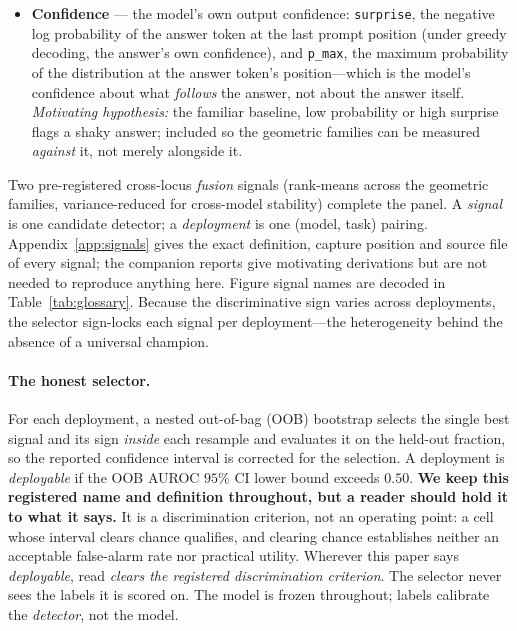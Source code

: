 \documentclass[11pt]{article}
\begin{document}
\begin{itemize}
spectral entropy, and a rank-1 ``pseudo-volume'' of the centered softmax-Fisher spectrum). Each is
\emph{averaged over the readout and the logit-lens distributions of the last quarter of blocks}, at
the answer token's position---not read from the readout alone, as the name might suggest
(Appendix~\ref{app:signals}). The one exception is the non-byte-comparable extension cells of
Section~\ref{sec:scale}, whose reimplemented extractors compute RPV on the readout alone.
\emph{Motivating hypothesis:} a well-supported readout concentrates on
a few output directions, while an unsupported one spreads probability over many, inflating its
effective volume.
\item \textbf{Confidence} --- the model's own output confidence: \texttt{surprise}, the negative log
probability of the answer token at the last prompt position (under greedy decoding, the answer's own
confidence), and \texttt{p\_max}, the maximum probability of the distribution at the answer token's
position---which is the model's confidence about what \emph{follows} the answer, not about the
answer itself. \emph{Motivating hypothesis:} the familiar baseline, low probability or high surprise
flags a shaky answer; included so the geometric families can be measured \emph{against} it, not
merely alongside it.
\end{itemize}
Two pre-registered cross-locus \emph{fusion} signals (rank-means across the geometric families,
variance-reduced for cross-model stability) complete the panel. A \emph{signal} is one candidate
detector; a \emph{deployment} is one (model, task) pairing. Appendix~\ref{app:signals} gives the
exact definition, capture position and source file of every signal; the companion reports
\cite{pri,ace,rpv} give motivating derivations but are not needed to reproduce anything here.
Figure signal names are decoded in Table~\ref{tab:glossary}.
Because the discriminative sign varies across deployments, the selector sign-locks each signal per
deployment---the heterogeneity behind the absence of a universal champion.

\paragraph{The honest selector.} For each deployment, a nested out-of-bag (OOB) bootstrap selects
the single best signal and its sign \emph{inside} each resample and evaluates it on the held-out
fraction, so the reported confidence interval is corrected for the selection. A deployment is
\emph{deployable} if the OOB AUROC $95\%$ CI lower bound exceeds $0.50$.
\textbf{We keep this registered name and definition throughout, but a reader
should hold it to what it says.} It is a discrimination criterion, not an
operating point: a cell whose interval clears chance qualifies, and clearing
chance establishes neither an acceptable false-alarm rate nor practical
utility. Wherever this paper says \emph{deployable}, read \emph{clears the
registered discrimination criterion}. The selector never sees
the labels it is scored on. The model is frozen throughout; labels calibrate the \emph{detector},
not the model.
\end{document}
